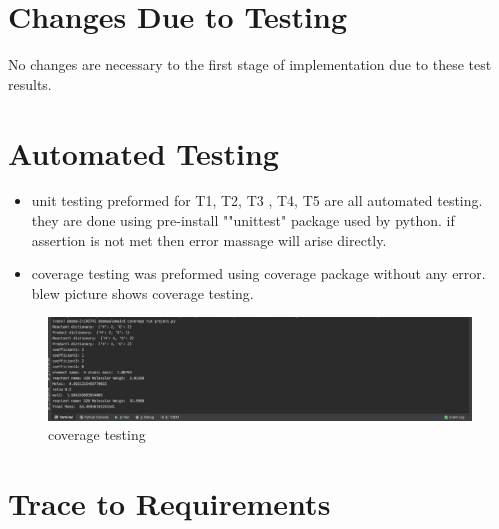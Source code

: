 \documentclass[12pt, titlepage]{article}
\begin{document}
\section{Changes Due to Testing}
No changes are necessary to the first stage of implementation due to these
test results.

\section{Automated Testing}
\begin{itemize}
\item unit testing preformed for T1, T2, T3 , T4, T5 are all automated testing. they are done using pre-install ""unittest" package used by python. if assertion is not met then error massage will arise directly. 
\item coverage testing was preformed using coverage package without any error. blew picture shows coverage testing.
\end{itemize}

\begin{figure}[h!]
 \begin{center}
 \includegraphics [width=\textwidth]{coverage}
 \caption{\label{ Figure 23:} coverage testing}
 \end{center}
 \end{figure}

		
\section{Trace to Requirements}\label{functional}
\begin{table}[h!]
\centering
{}
\caption{Traceability Matrix Showing the Connections Between unit test cases and functional requirements}
\label{Table:R_trace}
\end{table}
\end{document}

